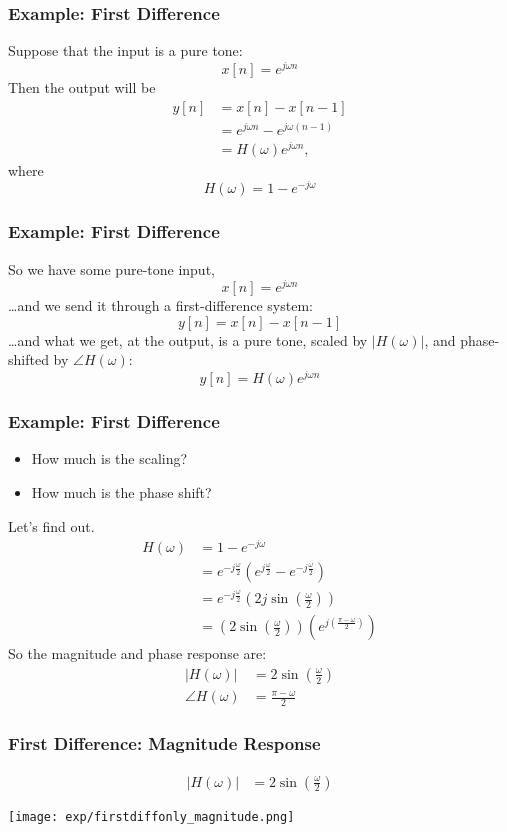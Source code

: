 \documentclass{beamer}
\begin{document}
\begin{frame}
  \frametitle{Example: First Difference}

  Suppose that the input is a pure tone:
  \[
  x[n] = e^{j\omega n}
  \]
  Then the output will be
  \begin{align*}
    y[n] &= x[n]-x[n-1]\\
    &= e^{j\omega n} -e^{j\omega (n-1)}\\
    &= H(\omega) e^{j\omega n},
  \end{align*}
  where
  \[
  H(\omega) = 1-e^{-j\omega}
  \]
\end{frame}

\begin{frame}
  \frametitle{Example: First Difference}

  So we have some pure-tone input,
  \[
  x[n]=e^{j\omega n}
  \]
  \ldots and we send it through a first-difference system:
  \[
  y[n] = x[n]-x[n-1]
  \]
  \ldots and what we get, at the output, is a pure tone, scaled by
  $|H(\omega)|$, and phase-shifted by $\angle H(\omega)$:
  \[
  y[n] = H(\omega) e^{j\omega n}
  \]
\end{frame}
  
\begin{frame}
  \frametitle{Example: First Difference}

  \begin{itemize}
  \item How much is the scaling?
  \item How much is the phase shift?
  \end{itemize}
  Let's find out.
  \begin{align*}
    H(\omega) &= 1-e^{-j\omega}\\
    &= e^{-j\frac{\omega}{2}} \left(e^{j\frac{\omega}{2}}-e^{-j\frac{\omega}{2}}\right)\\
    &= e^{-j\frac{\omega}{2}} \left(2j\sin\left(\frac{\omega}{2}\right)\right)\\
    &= \left(2\sin\left(\frac{\omega}{2}\right)\right)\left(e^{j\left(\frac{\pi-\omega}{2}\right)}\right)
  \end{align*}
  So the magnitude and phase response are:
  \begin{align*}
    |H(\omega)| &= 2\sin\left(\frac{\omega}{2}\right)\\
    \angle H(\omega) &= \frac{\pi-\omega}{2}
  \end{align*}
\end{frame}

\begin{frame}
  \frametitle{First Difference: Magnitude Response}

  \begin{align*}
    |H(\omega)| &= 2\sin\left(\frac{\omega}{2}\right)
  \end{align*}

  \centerline{\texttt{[image: exp/firstdiffonly\_magnitude.png]}}
\end{frame}
\end{document}
